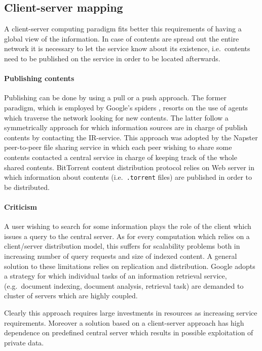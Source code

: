 \subsection{Client-server mapping}
A client-server computing paradigm fits better this requirements of having a global view of the information. In case of contents are spread out the entire network it is necessary to let the service know about its existence, i.e.\ contents need to be published on the service in order to be located afterwards.

\paragraph{Publishing contents}Publishing can be done by using a pull or a push approach. The former paradigm, which is employed by Google's spiders \cite{BP98}, resorts on the use of agents which traverse the network looking for new contents. The latter follow a symmetrically approach for which information sources are in charge of publish contents by contacting the IR-service. This approach was adopted by the Napster peer-to-peer file sharing service in which each peer wishing to share some contents contacted a central service in charge of keeping track of the whole shared contents. BitTorrent content distribution protocol \cite{Coh03} relies on Web server in which information about contents (i.e.\ \texttt{.torrent} files) are published in order to be distributed.

\paragraph{Criticism}
A user wishing to search for some information plays the role of the client which issues a query to the central server. As for every computation which relies on a client/server distribution model, this suffers for scalability problems both in increasing number of query requests and size of indexed content. A general solution to these limitations relies on replication and distribution. Google adopts a strategy for which individual tasks of an information retrieval service, (e.g.\ document indexing, document analysis, retrieval task) are demanded to cluster of servers which are highly coupled.

Clearly this approach requires large investments in resources as increasing service requirements. Moreover a solution based on a client-server approach has high dependence on predefined central server which results in possible exploitation of private data.

